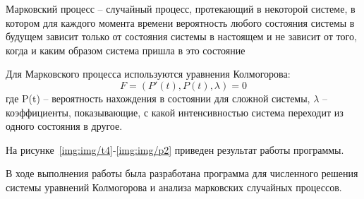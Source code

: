 %
%


Марковский процесс -- случайный процесс, протекающий в некоторой системе, в котором для каждого момента времени вероятность любого состояния системы в будущем зависит только от состояния системы в настоящем и не зависит от того, когда и каким образом система пришла в это состояние



Для Марковского процесса используются уравнения Колмогорова:
\begin{equation}
	F = (P'(t), P(t), \lambda)=0
\end{equation}
где P(t) – вероятность нахождения в состоянии для сложной системы, $\lambda$ – коэффициенты, показывающие, с какой интенсивностью система переходит из одного состояния в другое.


На рисунке~\ref{img:img/t4}-\ref{img:img/p2} приведен результат работы программы.

\FloatBarrier
{}
\FloatBarrier
{}
\FloatBarrier


В ходе выполнения работы была разработана программа для численного решения системы уравнений Колмогорова и анализа марковских случайных процессов. 
